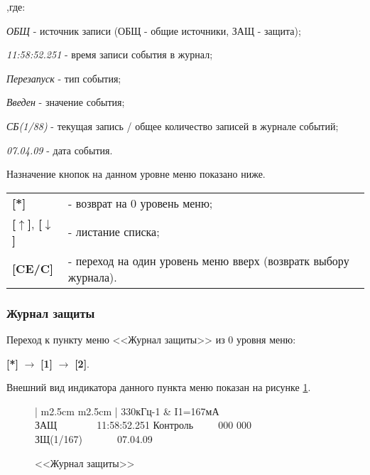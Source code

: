 \begin{ESKDexplanation}[1.5cm]
	\item[,где:]
	\item \textit{ОБЩ} - источник записи (ОБЩ - общие источники, ЗАЩ - защита);
	\item \textit{11:58:52.251} - время записи события в журнал;
	\item \textit{Перезапуск} - тип события;
	\item \textit{Введен} - значение события;
	\item \textit{СБ(1/88)} - текущая запись / общее количество записей в журнале событий;
	\item \textit{07.04.09} - дата события.
\end{ESKDexplanation}

Назначение кнопок на данном уровне меню показано ниже.
\begin{center}
	\begin{tabular}{p{2cm} p{15cm}}
		\textbf{[*]} & - возврат на 0 уровень меню; \tabularnewline
		\textbf{[$\uparrow$]}, \textbf{[$\downarrow$]}  & - листание списка; \tabularnewline
		\textbf{[CE/C]} & - переход на один уровень меню вверх (возвратк выбору журнала). \tabularnewline				
	\end{tabular}
\end{center} 


\subsubsection{Журнал защиты}

Переход к пункту меню <<Журнал защиты>> из 0 уровня меню: 

\textbf{[*]} $\rightarrow$ \textbf{[1]} $\rightarrow$ \textbf{[2]}.

Внешний вид индикатора данного пункта меню показан на рисунке \ref{fig:journal_def}.
 
 \begin{figure}[H]
 	\centering
		
	\begin{tabular}{| m{2.5cm}  m{2.5cm} |}
		\firsthline
		330кГц-1	& \raggedleft I1=167мА				\tabularnewline 
		 {ЗАЩ~~~~~~~~11:58:52.251} 	\tabularnewline
		 {Контроль~~~~~000 000} 	\tabularnewline 
		 {ЗЩ(1/167)~~~~~~~07.04.09}	\tabularnewline 
		\lasthline
	\end{tabular} 
	
	\caption{<<Журнал защиты>>}
	\label{fig:journal_def}
\end{figure}

